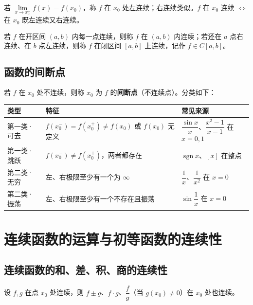若 $\lim\limits_{x\to x_0^-}f(x)=f(x_0)$，称 $f$ 在 $x_0$ 处左连续；右连续类似。$f$ 在 $x_0$ 连续 $\iff$ 在 $x_0$ 既左连续又右连续。

\noindent 若 $f$ 在开区间 $(a,b)$ 内每一点连续，则称 $f$ 在 $(a,b)$ 内连续；若还在 $a$ 点右连续、在 $b$ 点左连续，则称 $f$ 在闭区间 $[a,b]$ 上连续，记作 $f\in C[a,b]$。

\subsection{函数的间断点}
若 $f$ 在 $x_0$ 处不连续，则称 $x_0$ 为 $f$ 的\textbf{间断点}（不连续点）。分类如下：
\begin{center}
\begin{tabular}{@{}lll@{}}
\toprule
类型 & 特征 & 常见来源 \\
\midrule
第一类·可去 & $f(x_0^-)=f(x_0^+)\neq f(x_0)$ 或 $f(x_0)$ 无定义 & $\dfrac{\sin x}{x}$、$\dfrac{x^2-1}{x-1}$ 在 $x=0,1$ \\
第一类·跳跃 & $f(x_0^-)\neq f(x_0^+)$，两者都存在 & $\operatorname{sgn}x$、$[x]$ 在整点 \\
第二类·无穷 & 左、右极限至少有一个为 $\infty$ & $\dfrac1x$、$\dfrac{1}{x^2}$ 在 $x=0$ \\
第二类·振荡 & 左、右极限至少有一个不存在且振荡 & $\sin\dfrac1x$ 在 $x=0$ \\
\bottomrule
\end{tabular}
\end{center}


\section{连续函数的运算与初等函数的连续性}\label{sec:chudeng}

\subsection{连续函数的和、差、积、商的连续性}
设 $f,g$ 在点 $x_0$ 处连续，则 $f\pm g$、$f\cdot g$、$\dfrac fg$（当 $g(x_0)\neq0$）在 $x_0$ 处也连续。

